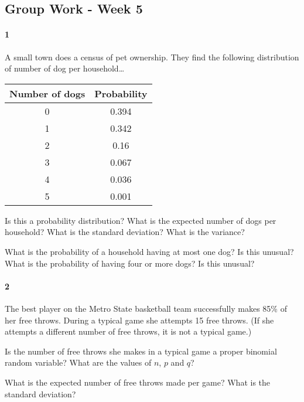 \documentclass{article}
\begin{document}
\begin{flushleft}
\section*{Group Work - Week 5}
\paragraph{1} A small town does a census of pet ownership. They find the following distribution of number of dog per household\ldots\\
{\centering
\begin{tabular}{c | c}
Number of dogs & Probability\\
\hline
0 & 0.394\\
1 & 0.342\\
2 & 0.16\\
3 & 0.067\\
4 & 0.036\\
5 & 0.001\\
\end{tabular} \par}
\begin{enumalpha}
\item Is this a probability distribution? What is the expected number of dogs per household? What is the standard deviation? What is the variance?
\vspace{3in}
\item What is the probability of a household having at most one dog? Is this unusual? What is the probability of having four or more dogs? Is this unusual?
\end{enumalpha}



\newpage
\paragraph{2} The best player on the Metro State basketball team successfully makes 85\% of her free throws. During a typical game she attempts 15 free throws. (If she attempts a different number of free throws, it is not a typical game.)
\begin{enumalpha}
\item Is the number of free throws she makes in a typical game a proper binomial random variable? What are the values of $n$, $p$ and $q$?

\vspace{1.8in}
\item What is the expected number of free throws made per game? What is the standard deviation?


\end{enumalpha}
\end{flushleft}
\end{document}
